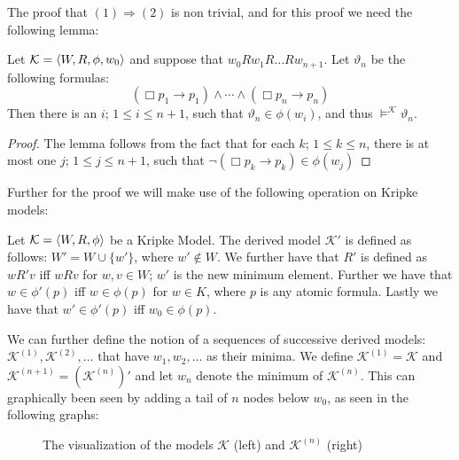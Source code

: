 \documentclass[../main.tex]{subfiles}
\begin{document}
	The proof that $(1)\Rightarrow(2)$ is non trivial, and for this proof
	we need the following lemma:
	\begin{lem}
		\label{lem:hvad}
		Let $\mathcal{K}=\langle W,R,\phi,w_0\rangle$ and suppose that
		$w_0Rw_1R\ldots Rw_{n+1}$. Let $\vartheta_n$ be the following
		formulas:
		\[(\Box p_1\rightarrow p_1)\wedge\cdots\wedge(\Box p_n\rightarrow
		p_n)\]
		Then there is an $i$; $1\leq i\leq n+1$, such that
		$\vartheta_n\in\phi(w_i)$, and thus
		$\vDash^\mathcal{K}\vartheta_n$.
	\end{lem}
	\begin{proof}
		The lemma follows from the fact that for each $k$; $1\leq k\leq
		n$, there is at most one $j$; $1\leq j\leq n+1$, such that
		$\neg(\Box p_k\rightarrow p_k)\in\phi(w_j)$
	\end{proof}
Further for the proof we will make use of the following operation on Kripke models:
\begin{defi}
	Let $\mathcal{K}=\langle W,R,\phi\rangle$ be a Kripke Model. The derived model
	$\mathcal{K'}$ is defined as follows: $W'=W\cup \{w'\}$, where
	$w'\not\in W$. We further have that $R'$ is defined as $wR'v$ iff $wRv$
	for $w,v\in W$; $w'$ is the new minimum element. Further we have that
	$w\in\phi'(p)$ iff $w\in\phi(p)$ for $w\in K$, where $p$ is any atomic
	formula. Lastly we have that $w'\in\phi'(p)$ iff $w_0\in\phi(p)$.
\end{defi}
We can further define the notion of a sequences of successive derived models:
$\mathcal{K}^{(1)},\mathcal{K}^{(2)},\ldots$ that have $w_1,w_2,\ldots$ as
their minima. We define $\mathcal{K}^{(1)}=\mathcal{K}$ and
$\mathcal{K}^{(n+1)}=(\mathcal{K}^{(n)})'$ and let $w_n$ denote the minimum of
$\mathcal{K}^{(n)}$. This can graphically been seen by adding a tail of $n$
nodes below $w_0$, as seen in the following graphs:
\newpage

\begin{figure}[h]
	\begin{center}
\qquad
\qquad
{}
\end{center}
\caption{The visualization of the models $\mathcal{K}$ (left) and
$\mathcal{K}^{(n)}$ (right)}
\end{figure}
\end{document}
